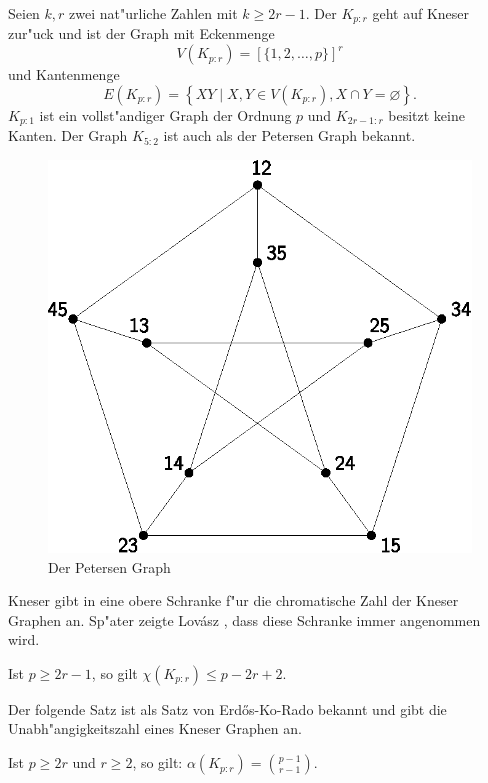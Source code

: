   Seien $k,r$ zwei nat"urliche Zahlen mit $k\geq 2r-1$. Der  $K_{p:r}$ geht auf Kneser \cite{Kneser55} zur"uck und ist der Graph mit Eckenmenge $$V(K_{p:r}) = [\{1,2,\dots,p\}]^{r}$$ und Kantenmenge 
  $$E(K_{p:r}) = \left\{ XY\;|\; X,Y \in V(K_{p:r}), X \cap Y = \varnothing \right\}.$$ 
  $K_{p:1}$ ist ein vollst"andiger Graph der Ordnung $p$ und $K_{2r-1:r}$ besitzt keine Kanten. 
  Der Graph $K_{5:2}$ ist auch als der Petersen Graph bekannt.

  \begin{figure}[h]
    \centering
    \includegraphics{images/petersen}
    \caption{Der Petersen Graph}
    \label{fig:petersen}
  \end{figure}
  Kneser gibt in \cite{Kneser55} eine obere Schranke f"ur die chromatische Zahl der Kneser Graphen an. Sp"ater zeigte Lov\'asz , dass diese Schranke immer angenommen wird.
  \begin{theorem}
    Ist $p\geq 2r-1$, so gilt
    $\chi(K_{p:r}) \leq p-2r+2$. \label{thm:kneserfarbung}
  \end{theorem}
  Der folgende Satz ist als Satz von Erd\H{o}s-Ko-Rado \cite{ErdosKoRado61} bekannt und gibt die Unabh"angigkeitszahl eines Kneser Graphen an.
  \begin{theorem}
    Ist $p\geq 2r$ und $r \geq 2$, so gilt: 
    $\alpha(K_{p:r})= \binom{p-1}{r-1}$.
    \label{thm:ErdosKoRado}
  \end{theorem}
